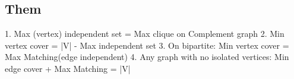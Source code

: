 \subsection{Them}
	1. Max (vertex) independent set = Max clique on Complement graph
	2. Min vertex cover = |V| - Max independent set
	3. On bipartite: Min vertex cover = Max Matching(edge independent)
	4. Any graph with no isolated vertices: Min edge cover + Max Matching = |V|
